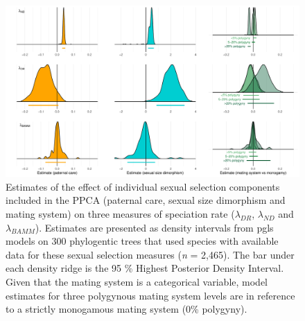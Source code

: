 \documentclass[]{article}
\begin{document}
\begin{figure}
\centering
\includegraphics{Figures/Individual_SS_Estimates.pdf}
\caption{Estimates of the effect of individual sexual selection
components included in the PPCA (paternal care, sexual size dimorphism
and mating system) on three measures of speciation rate
(\(\lambda_{DR}\), \(\lambda_{ND}\) and \(\lambda_{BAMM}\)). Estimates
are presented as density intervals from pgls models on 300 phylogentic
trees that used species with available data for these sexual selection
measures (\emph{n} = 2,465). The bar under each density ridge is the 95
\% Highest Posterior Density Interval. Given that the mating system is a
categorical variable, model estimates for three polygynous mating system
levels are in reference to a strictly monogamous mating system (0\%
polygyny). \label{SS_components}}
\end{figure}
\end{document}

